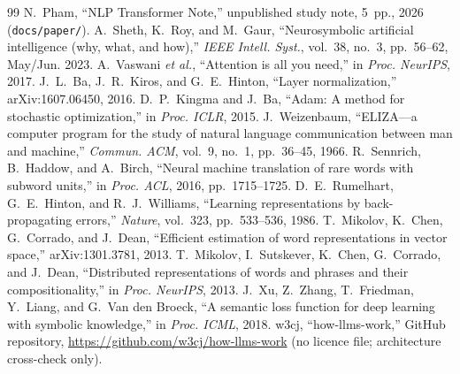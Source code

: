 \documentclass[conference]{IEEEtran}
\begin{document}
\begin{thebibliography}{99}
 N.~Pham, ``NLP Transformer Note,'' unpublished study note, 5~pp., 2026 (\texttt{docs/paper/}).
 A.~Sheth, K.~Roy, and M.~Gaur, ``Neurosymbolic artificial intelligence (why, what, and how),'' \emph{IEEE Intell. Syst.}, vol.~38, no.~3, pp.~56--62, May/Jun. 2023.
 A.~Vaswani \emph{et al.}, ``Attention is all you need,'' in \emph{Proc. NeurIPS}, 2017.
 J.~L.~Ba, J.~R.~Kiros, and G.~E.~Hinton, ``Layer normalization,'' arXiv:1607.06450, 2016.
 D.~P.~Kingma and J.~Ba, ``Adam: A method for stochastic optimization,'' in \emph{Proc. ICLR}, 2015.
 J.~Weizenbaum, ``ELIZA---a computer program for the study of natural language communication between man and machine,'' \emph{Commun. ACM}, vol.~9, no.~1, pp.~36--45, 1966.
 R.~Sennrich, B.~Haddow, and A.~Birch, ``Neural machine translation of rare words with subword units,'' in \emph{Proc. ACL}, 2016, pp.~1715--1725.
 D.~E.~Rumelhart, G.~E.~Hinton, and R.~J.~Williams, ``Learning representations by back-propagating errors,'' \emph{Nature}, vol.~323, pp.~533--536, 1986.
 T.~Mikolov, K.~Chen, G.~Corrado, and J.~Dean, ``Efficient estimation of word representations in vector space,'' arXiv:1301.3781, 2013.
 T.~Mikolov, I.~Sutskever, K.~Chen, G.~Corrado, and J.~Dean, ``Distributed representations of words and phrases and their compositionality,'' in \emph{Proc. NeurIPS}, 2013.
 J.~Xu, Z.~Zhang, T.~Friedman, Y.~Liang, and G.~Van den Broeck, ``A semantic loss function for deep learning with symbolic knowledge,'' in \emph{Proc. ICML}, 2018.
 w3cj, ``how-llms-work,'' GitHub repository, \url{https://github.com/w3cj/how-llms-work} (no licence file; architecture cross-check only).
\end{thebibliography}
\end{document}
